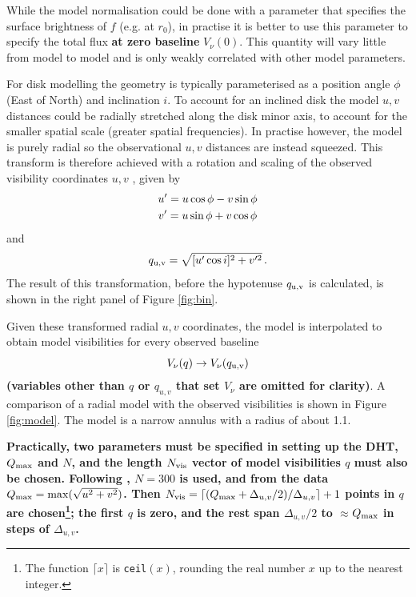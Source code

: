 \documentclass[fleqn,usenatbib]{mnras}
\begin{document}
While the model normalisation could be done with a parameter that specifies the surface brightness of $f$ (e.g. at $r_0$), in practise it is better to use this parameter to specify the total flux \textbf{at zero baseline} $V_\nu(0)$. This quantity will vary little from model to model and is only weakly correlated with other model parameters.

For disk modelling the geometry is typically parameterised as a position angle $\phi$ (East of North) and inclination $i$. To account for an inclined disk the model $u,v$ distances could be radially stretched along the disk minor axis, to account for the smaller spatial scale (greater spatial frequencies). In practise however, the model is purely radial so the observational $u,v$ distances are instead squeezed. This transform is therefore achieved with a rotation and scaling of the observed visibility coordinates $u,v$ \citep[e.g. as in][]{2018MNRAS.476.4527T}, given by
\begin{gather}
    u' = u \cos \phi - v \sin \phi \notag \\
    v' = u \sin \phi + v \cos \phi
\end{gather}
and 
\begin{equation}\label{eq:trans}
    q_{\rm u,v} = \sqrt{[u' \cos i]^2 + v'^2} \, .
\end{equation}
The result of this transformation, before the hypotenuse $q_{\rm u,v}$ is calculated, is shown in the right panel of Figure \ref{fig:bin}.

Given these transformed radial $u,v$ coordinates, the model is interpolated to obtain model visibilities for every observed baseline
\begin{equation}
    V_\nu(q) \rightarrow V_\nu(q_{\rm u,v})
\end{equation}
\textbf{(variables other than $q$ or $q_{u,v}$ that set $V_\nu$ are omitted for clarity)}. A comparison of a radial model with the observed visibilities is shown in Figure \ref{fig:model}. The model is a narrow annulus with a radius of about 1.1\arcsec.

\textbf{Practically, two parameters must be specified in setting up the DHT, $Q_{\rm max}$ and $N$, and the length $N_{\rm vis}$ vector of model visibilities $q$ must also be chosen. Following \citet{2020MNRAS.tmp.1491J}, $N=300$ is used, and from the data $Q_{\rm max} = \max(\sqrt{u^2+v^2})$. Then $N_{\rm vis} = \lceil (Q_{\rm max}+\Delta_{u,v}/2)/\Delta_{u,v} \rceil + 1$ points in $q$ are chosen\footnote{The function $\lceil x \rceil$ is \texttt{ceil}$(x)$, rounding the real number $x$ up to the nearest integer.}; the first $q$ is zero, and the rest span $\Delta_{u,v}/2$ to $\approx$$Q_{\rm max}$ in steps of $\Delta_{u,v}$.}
\end{document}
